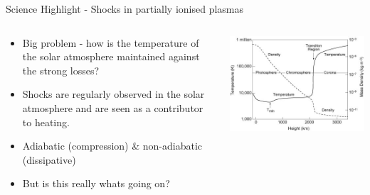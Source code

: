 \documentclass[10pt,aspectratio=169,usenames,dvipsnames]{beamer}
\begin{document}
\begin{frame}{Science Highlight - Shocks in partially ionised plasmas}
\begin{columns}
\begin{column}{0.5\textwidth}
\begin{itemize}
    \item Big problem - how is the temperature of the solar atmosphere maintained against the strong losses?
    \item Shocks are regularly observed in the solar atmosphere and are seen as a contributor to heating.
    \item Adiabatic (compression) \& non-adiabatic (dissipative)
    \item But is this really whats going on?
\end{itemize}
\end{column}
\begin{column}{0.5\textwidth}
\includegraphics[width=0.95\linewidth]{2023Dundee/Figures/valc.png}
\end{column}
\end{columns}
\end{frame}
\end{document}
